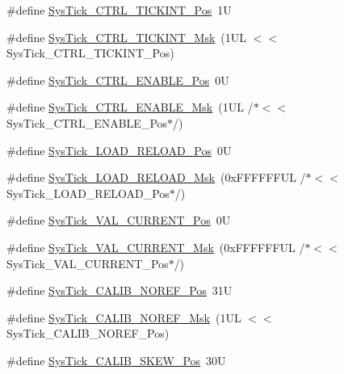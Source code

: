 \begin{DoxyCompactItemize}
\item 
\#define \hyperlink{group___c_m_s_i_s___sys_tick_ga88f45bbb89ce8df3cd2b2613c7b48214}{Sys\+Tick\+\_\+\+C\+T\+R\+L\+\_\+\+T\+I\+C\+K\+I\+N\+T\+\_\+\+Pos}~1U
\item 
\#define \hyperlink{group___c_m_s_i_s___sys_tick_ga95bb984266ca764024836a870238a027}{Sys\+Tick\+\_\+\+C\+T\+R\+L\+\_\+\+T\+I\+C\+K\+I\+N\+T\+\_\+\+Msk}~(1\+U\+L $<$$<$ Sys\+Tick\+\_\+\+C\+T\+R\+L\+\_\+\+T\+I\+C\+K\+I\+N\+T\+\_\+\+Pos)
\item 
\#define \hyperlink{group___c_m_s_i_s___sys_tick_ga0b48cc1e36d92a92e4bf632890314810}{Sys\+Tick\+\_\+\+C\+T\+R\+L\+\_\+\+E\+N\+A\+B\+L\+E\+\_\+\+Pos}~0U
\item 
\#define \hyperlink{group___c_m_s_i_s___sys_tick_ga16c9fee0ed0235524bdeb38af328fd1f}{Sys\+Tick\+\_\+\+C\+T\+R\+L\+\_\+\+E\+N\+A\+B\+L\+E\+\_\+\+Msk}~(1\+U\+L /$\ast$$<$$<$ Sys\+Tick\+\_\+\+C\+T\+R\+L\+\_\+\+E\+N\+A\+B\+L\+E\+\_\+\+Pos$\ast$/)
\item 
\#define \hyperlink{group___c_m_s_i_s___sys_tick_gaf44d10df359dc5bf5752b0894ae3bad2}{Sys\+Tick\+\_\+\+L\+O\+A\+D\+\_\+\+R\+E\+L\+O\+A\+D\+\_\+\+Pos}~0U
\item 
\#define \hyperlink{group___c_m_s_i_s___sys_tick_ga265912a7962f0e1abd170336e579b1b1}{Sys\+Tick\+\_\+\+L\+O\+A\+D\+\_\+\+R\+E\+L\+O\+A\+D\+\_\+\+Msk}~(0x\+F\+F\+F\+F\+F\+F\+U\+L /$\ast$$<$$<$ Sys\+Tick\+\_\+\+L\+O\+A\+D\+\_\+\+R\+E\+L\+O\+A\+D\+\_\+\+Pos$\ast$/)
\item 
\#define \hyperlink{group___c_m_s_i_s___sys_tick_ga3208104c3b019b5de35ae8c21d5c34dd}{Sys\+Tick\+\_\+\+V\+A\+L\+\_\+\+C\+U\+R\+R\+E\+N\+T\+\_\+\+Pos}~0U
\item 
\#define \hyperlink{group___c_m_s_i_s___sys_tick_gafc77b56d568930b49a2474debc75ab45}{Sys\+Tick\+\_\+\+V\+A\+L\+\_\+\+C\+U\+R\+R\+E\+N\+T\+\_\+\+Msk}~(0x\+F\+F\+F\+F\+F\+F\+U\+L /$\ast$$<$$<$ Sys\+Tick\+\_\+\+V\+A\+L\+\_\+\+C\+U\+R\+R\+E\+N\+T\+\_\+\+Pos$\ast$/)
\item 
\#define \hyperlink{group___c_m_s_i_s___sys_tick_ga534dbe414e7a46a6ce4c1eca1fbff409}{Sys\+Tick\+\_\+\+C\+A\+L\+I\+B\+\_\+\+N\+O\+R\+E\+F\+\_\+\+Pos}~31U
\item 
\#define \hyperlink{group___c_m_s_i_s___sys_tick_ga3af0d891fdd99bcc8d8912d37830edb6}{Sys\+Tick\+\_\+\+C\+A\+L\+I\+B\+\_\+\+N\+O\+R\+E\+F\+\_\+\+Msk}~(1\+U\+L $<$$<$ Sys\+Tick\+\_\+\+C\+A\+L\+I\+B\+\_\+\+N\+O\+R\+E\+F\+\_\+\+Pos)
\item 
\#define \hyperlink{group___c_m_s_i_s___sys_tick_gadd0c9cd6641b9f6a0c618e7982954860}{Sys\+Tick\+\_\+\+C\+A\+L\+I\+B\+\_\+\+S\+K\+E\+W\+\_\+\+Pos}~30U

\end{DoxyCompactItemize}
